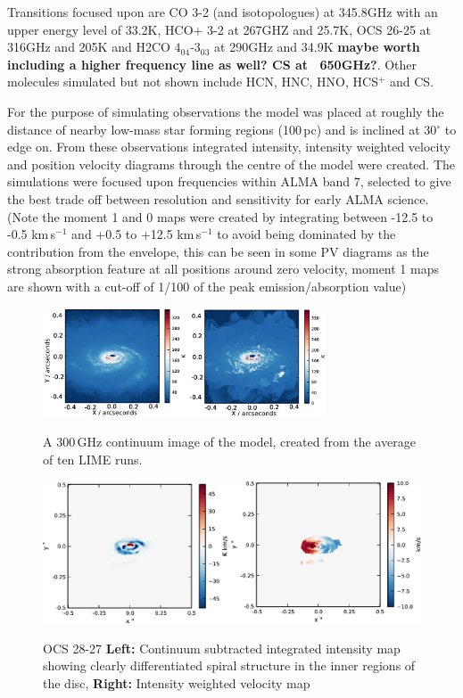 \documentclass[useAMS,usenatbib]{mn2e}
\begin{document}
Transitions focused upon are CO 3-2 (and isotopologues) at 345.8GHz with an upper energy level of 33.2K, HCO+ 3-2 at 267GHZ and 25.7K, OCS 26-25 at 316GHz and 205K and H2CO $4_{04}$-3$_{03}$ at 290GHz and 34.9K {\bf maybe worth including a higher frequency line as well? CS at ~650GHz?}. Other molecules simulated but not shown include HCN, HNC, HNO, HCS$^+$ and CS.\newline

For the purpose of simulating observations the model was placed at roughly the distance of nearby low-mass star forming regions (100$\,$pc) and is inclined at 30$^\circ$ to edge on. From these observations integrated intensity, intensity weighted velocity and position velocity diagrams through the centre of the model were created.
The simulations were focused upon frequencies within ALMA band 7, selected to give the best trade off between resolution and sensitivity for early ALMA science.
(Note the moment 1 and 0 maps were created by integrating between -12.5 to -0.5 km$\,$s$^{-1}$ and +0.5 to +12.5 km$\,$s$^{-1}$ to avoid being dominated by the contribution from the envelope, this can be seen in some PV diagrams as the strong absorption feature at all positions around zero velocity, moment 1 maps are shown with a cut-off of 1/100 of the peak emission/absorption value)\newline

\begin{figure}
 \includegraphics[width=84mm]{Figures/sim/continuum.eps}
 \label{points}
 \caption{A 300$\,$GHz continuum image of the model, created from the average of ten LIME runs.}
\end{figure}

\begin{figure}
 \includegraphics[width=168mm]{Figures/sim/imageOCS_28-27_30deg_composite_all.eps}
 \label{OCS_all}
 \caption{OCS 28-27 {\bf Left:} Continuum subtracted integrated intensity map showing clearly differentiated spiral structure in the inner regions of the disc, {\bf Right:} Intensity weighted velocity map}
\end{figure}
\end{document}
